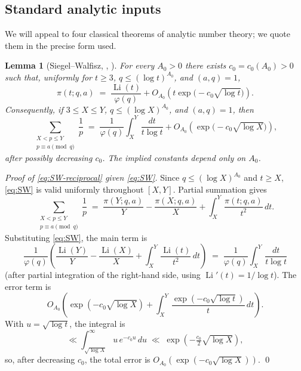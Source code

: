 \documentclass[11pt,reqno]{amsart}
\theoremstyle{plain}
\newtheorem{lemma}[theorem]{Lemma}
\theoremstyle{definition}
\DeclareMathOperator{\li}{Li}
\begin{document}
\subsection{Standard analytic inputs}

We will appeal to four classical theorems of analytic number theory; we quote them in the precise form used.

\begin{lemma}[Siegel--Walfisz, {\cite[Ch.~22]{Davenport}, \cite{SiegelWalfisz}}]\label{lem:SW}
For every $A_0>0$ there exists $c_0=c_0(A_0)>0$ such that, uniformly for
$t\ge 3$, $q\le(\log t)^{A_0}$, and $(a,q)=1$,
\begin{equation}\label{eq:SW}
\pi(t;q,a)
\;=\;
\frac{\li(t)}{\varphi(q)}
+
O_{A_0}\!\left(t\exp\!\bigl(-c_0\sqrt{\log t}\bigr)\right).
\end{equation}
Consequently, if $3\le X\le Y$, $q\le(\log X)^{A_0}$, and $(a,q)=1$, then
\begin{equation}\label{eq:SW-reciprocal}
\sum_{\substack{X<p\le Y\\ p\equiv a\pmod q}}\frac1p
\;=\;
\frac1{\varphi(q)}\int_X^Y\frac{dt}{t\log t}
+
O_{A_0}\!\left(\exp\!\bigl(-c_0\sqrt{\log X}\bigr)\right),
\end{equation}
after possibly decreasing $c_0$. The implied constants depend only on $A_0$.
\end{lemma}

\begin{proof}[Proof of \eqref{eq:SW-reciprocal} given \eqref{eq:SW}]
Since $q\le(\log X)^{A_0}$ and $t\ge X$, \eqref{eq:SW} is valid uniformly
throughout $[X,Y]$. Partial summation gives
\[
\sum_{\substack{X<p\le Y\\ p\equiv a\pmod q}}\frac1p
\;=\;
\frac{\pi(Y;q,a)}{Y}
-\frac{\pi(X;q,a)}{X}
+
\int_X^Y \frac{\pi(t;q,a)}{t^2}\,dt.
\]
Substituting \eqref{eq:SW}, the main term is
\[
\frac1{\varphi(q)}
\left(
\frac{\li(Y)}{Y}
-\frac{\li(X)}{X}
+\int_X^Y\frac{\li(t)}{t^2}\,dt
\right)
\;=\;
\frac1{\varphi(q)}\int_X^Y\frac{dt}{t\log t}
\]
(after partial integration of the right-hand side, using $\li'(t)=1/\log t$).
The error term is
\[
O_{A_0}\!\left(
\exp(-c_0\sqrt{\log X})
+
\int_X^Y \frac{\exp(-c_0\sqrt{\log t})}{t}\,dt
\right).
\]
With $u=\sqrt{\log t}$, the integral is
\[
\ll \int_{\sqrt{\log X}}^\infty u\,e^{-c_0u}\,du
\;\ll\; \exp\!\left(-\tfrac{c_0}{2}\sqrt{\log X}\right),
\]
so, after decreasing $c_0$, the total error is
$O_{A_0}(\exp(-c_0\sqrt{\log X}))$. \qed
\end{proof}
\end{document}

